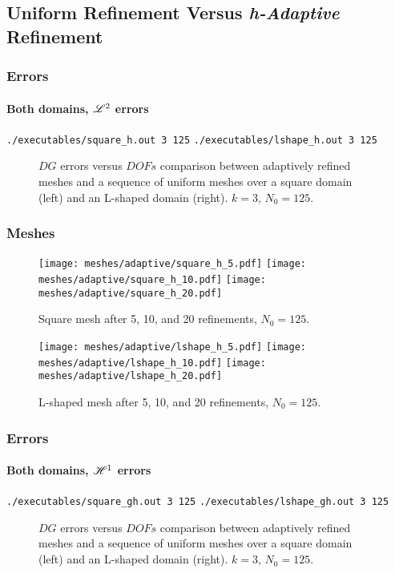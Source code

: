\subsection{Uniform Refinement Versus \textit{h-Adaptive} Refinement}

\begin{frame}[fragile]
    \frametitle{Errors}
    \framesubtitle{Both domains, $\mathscr{L}^2$ errors}

    \lstinline{./executables/square_h.out 3 125}
    \lstinline{./executables/lshape_h.out 3 125}

    \begin{figure}[!ht]
        
        \caption{$DG$ errors versus $DOFs$ comparison between adaptively refined meshes and a sequence of uniform meshes over a square domain (left) and an L-shaped domain (right). $k = 3$, $N_0 = 125$.}
    \end{figure}
\end{frame}

\begin{frame}
    \frametitle{Meshes}

    \begin{figure}[!ht]
        \centering
        \texttt{[image: meshes/adaptive/square\_h\_5.pdf]}
        \texttt{[image: meshes/adaptive/square\_h\_10.pdf]}
        \texttt{[image: meshes/adaptive/square\_h\_20.pdf]}
        \caption{Square mesh after 5, 10, and 20 refinements, $N_0 = 125$.}
    \end{figure}
    
    \begin{figure}[!ht]
        \centering
        \texttt{[image: meshes/adaptive/lshape\_h\_5.pdf]}
        \texttt{[image: meshes/adaptive/lshape\_h\_10.pdf]}
        \texttt{[image: meshes/adaptive/lshape\_h\_20.pdf]}
        \caption{L-shaped mesh after 5, 10, and 20 refinements, $N_0 = 125$.}
    \end{figure}
\end{frame}

\begin{frame}[fragile]
    \frametitle{Errors}
    \framesubtitle{Both domains, $\mathscr{H}^1$ errors}

    \lstinline{./executables/square_gh.out 3 125}
    \lstinline{./executables/lshape_gh.out 3 125}

    \begin{figure}[!ht]
        
        \caption{$DG$ errors versus $DOFs$ comparison between adaptively refined meshes and a sequence of uniform meshes over a square domain (left) and an L-shaped domain (right). $k = 3$, $N_0 = 125$.}
    \end{figure}
\end{frame}

